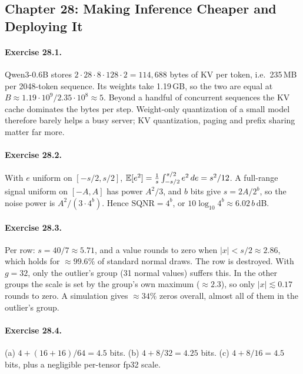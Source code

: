\subsection*{Chapter 28: Making Inference Cheaper and Deploying It}

\paragraph{Exercise 28.1.} Qwen3-0.6B stores $2\cdot28\cdot8\cdot128\cdot2=114{,}688$ bytes
of KV per token, i.e.\ 235\,MB per 2048-token sequence. Its weights take 1.19\,GB, so the
two are equal at $B\approx1.19\cdot10^9/2.35\cdot10^8\approx5$. Beyond a handful of
concurrent sequences the KV cache dominates the bytes per step. Weight-only quantization
of a small model therefore barely helps a busy server; KV quantization, paging and
prefix sharing matter far more.

\paragraph{Exercise 28.2.} With $e$ uniform on $[-s/2,s/2]$,
$\mathbb{E}[e^2]=\frac1s\int_{-s/2}^{s/2}e^2\,de=s^2/12$. A full-range signal uniform on $[-A,A]$
has power $A^2/3$, and $b$ bits give $s=2A/2^b$, so the noise power is
$A^2/(3\cdot4^b)$. Hence $\mathrm{SQNR}=4^b$, or $10\log_{10}4^b\approx6.02\,b$\,dB.

\paragraph{Exercise 28.3.} Per row: $s=40/7\approx5.71$, and a value rounds to zero when
$|x|<s/2\approx2.86$, which holds for $\approx99.6\%$ of standard normal draws. The row is
destroyed. With $g=32$, only the outlier's group (31 normal values) suffers this. In the
other groups the scale is set by the group's own maximum ($\approx2.3$), so only
$|x|\lesssim0.17$ rounds to zero. A simulation gives $\approx34\%$ zeros overall, almost
all of them in the outlier's group.

\paragraph{Exercise 28.4.} (a) $4+(16+16)/64=4.5$ bits. (b) $4+8/32=4.25$ bits.
(c) $4+8/16=4.5$ bits, plus a negligible per-tensor fp32 scale.

